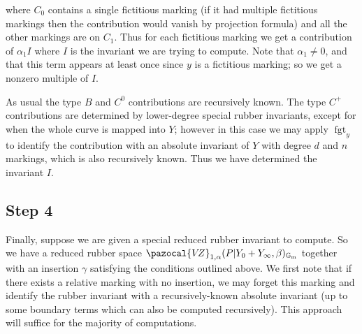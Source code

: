 \documentclass[11pt]{amsart}
\newcommand{\sqC}{\scalebox{0.8}[1.3]{$\sqsubset$}}
\newcommand{\VZ}{\pazocal{V\!Z}}
\newcommand{\Gm}{\mathbb{G}_{\text{m}}}
\newcommand{\fgt}{\operatorname{fgt}}
\theoremstyle{definition}
\theoremstyle{definition}
\begin{document}
\begin{center}
\end{center}
where $C_0$ contains a single fictitious marking (if it had multiple fictitious markings then the contribution would vanish by projection formula) and all the other markings are on $C_1$. Thus for each fictitious marking we get a contribution of $\alpha_1 I$ where $I$ is the invariant we are trying to compute. Note that $\alpha_1 \neq 0$, and that this term appears at least once since $y$ is a fictitious marking; so we get a nonzero multiple of $I$.

As usual the type $B$ and $C^0$ contributions are recursively known. The type $C^+$ contributions are determined by lower-degree special rubber invariants, except for when the whole curve is mapped into $Y$; however in this case we may apply $\fgt_y$ to identify the contribution with an absolute invariant of $Y$ with degree $d$ and $n$ markings, which is also recursively known. Thus we have determined the invariant $I$.

\subsection*{Step 4} Finally, suppose we are given a special reduced rubber invariant to compute. So we have a reduced rubber space $\VZ_{1,\alpha}(P|Y_0+Y_\infty,\beta)_{\Gm}$ together with an insertion $\gamma$ satisfying the conditions outlined above. We first note that if there exists a relative marking with no insertion, we may forget this marking and identify the rubber invariant with a recursively-known absolute invariant (up to some boundary terms which can also be computed recursively). This approach will suffice for the majority of computations.
\end{document}
